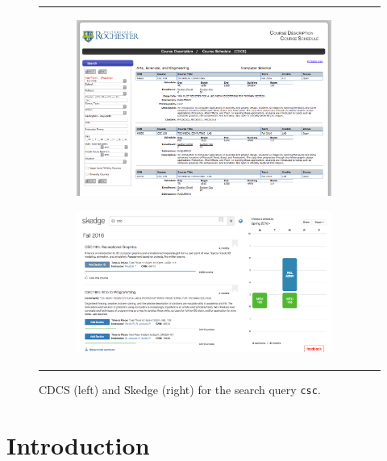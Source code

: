\documentclass[titlepage]{article}
\begin{document}
\begin{figure}[ht]
    \centering
    \begin{tabular}{c c}
        \begin{subfigure}[h]{6.5cm}
            \centering
            \includegraphics[width=1.00\textwidth]{images/cdcs}
        \end{subfigure}
        \hspace{1em}
        \begin{subfigure}[h]{7.5cm}
            \centering
            \includegraphics[width=1.00\textwidth]{images/skedge}
        \end{subfigure}
    \end{tabular}
    \caption{CDCS (left) and Skedge (right) for the search query {\tt csc}.}
\end{figure}

\section{Introduction}
\end{document}
